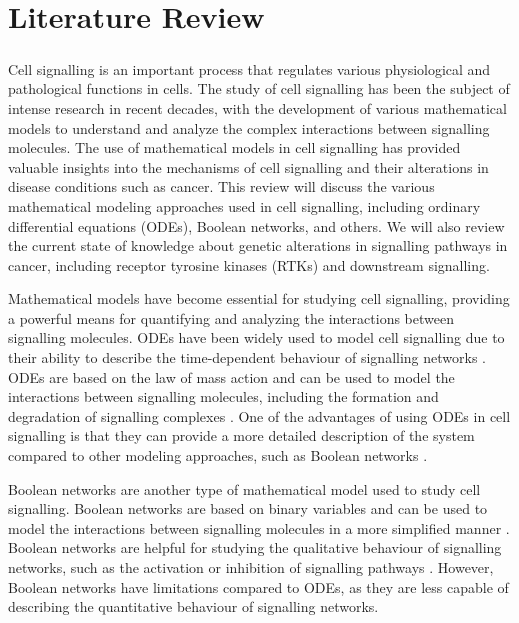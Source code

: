 \chapter{Literature Review}
\label{chap:01}

\paragraph{}

Cell signalling is an important process that regulates various physiological and pathological functions in cells. The study of cell signalling has been the subject of intense research in recent decades, with the development of various mathematical models to understand and analyze the complex interactions between signalling molecules. The use of mathematical models in cell signalling has provided valuable insights into the mechanisms of cell signalling and their alterations in disease conditions such as cancer. This review will discuss the various mathematical modeling approaches used in cell signalling, including ordinary differential equations (ODEs), Boolean networks, and others. We will also review the current state of knowledge about genetic alterations in signalling pathways in cancer, including receptor tyrosine kinases (RTKs) and downstream signalling.

Mathematical models have become essential for studying cell signalling, providing a powerful means for quantifying and analyzing the interactions between signalling molecules. ODEs have been widely used to model cell signalling due to their ability to describe the time-dependent behaviour of signalling networks \cite{glynn2014mathematical}. ODEs are based on the law of mass action and can be used to model the interactions between signalling molecules, including the formation and degradation of signalling complexes \cite{sible2007mathematical}. One of the advantages of using ODEs in cell signalling is that they can provide a more detailed description of the system compared to other modeling approaches, such as Boolean networks \cite{song2021quantitative}.

Boolean networks are another type of mathematical model used to study cell signalling. Boolean networks are based on binary variables and can be used to model the interactions between signalling molecules in a more simplified manner \cite{schwab2020concepts}. Boolean networks are helpful for studying the qualitative behaviour of signalling networks, such as the activation or inhibition of signalling pathways \cite{bock2014boolesim}. However, Boolean networks have limitations compared to ODEs, as they are less capable of describing the quantitative behaviour of signalling networks.

